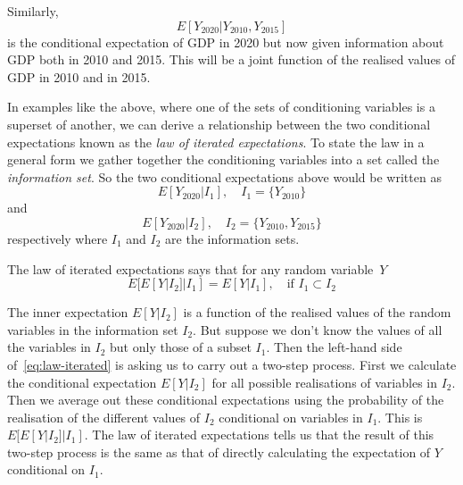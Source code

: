 \documentclass[12pt,reqno,openany]{amsbook}
\theoremstyle{plain}
\theoremstyle{definition}
\newcommand{\newterm}[1]{\emph{#1}}
\begin{document}
Similarly,
\[E[Y_{2020}|Y_{2010},Y_{2015}]\]
is the conditional expectation of GDP in 2020 but now given
information about  GDP both in 2010 and 2015. This will be a joint function
of the realised values of GDP in 2010 and in 2015.

In examples like the above, where one of the sets of conditioning
variables is a superset of another, we can derive a relationship
between the two conditional expectations known as the \newterm{law of
  iterated expectations}. To state the law in a general form we gather
together the conditioning variables into a set called the
\newterm{information set}. So the two conditional expectations above
would be written as
\[E[Y_{2020}|I_1], \quad I_1=\{Y_{2010}\}\]
and 
\[E[Y_{2020}|I_2], \quad I_2=\{Y_{2010},Y_{2015}\}\]
respectively where $I_1$ and $I_2$ are the information sets. 

The law of iterated expectations says that for any random variable~$Y$
\begin{equation}\label{eq:law-iterated}
E[E[Y|I_2]|I_1]=E[Y|I_1],\quad \text{if $I_1 \subset I_2$}
\end{equation}

The inner expectation $E[Y|I_2]$ is a function of the realised values
of the random variables in the information set $I_2$. But suppose we
don't know the values of all the variables in $I_2$ but only those of
a subset $I_1$. Then the left-hand side of~\eqref{eq:law-iterated} is
asking us to carry out a two-step process. First we calculate the
conditional expectation $E[Y|I_2]$ for all possible realisations of
variables in $I_2$. Then we average out these conditional expectations
using the probability of the realisation of the different
values of $I_2$ conditional on variables in $I_1$. This is
$E[E[Y|I_2]|I_1]$. The law of iterated
expectations tells us that the result of this two-step process is the
same as that of directly calculating the expectation of
$Y$ conditional on $I_1$.
\end{document}
